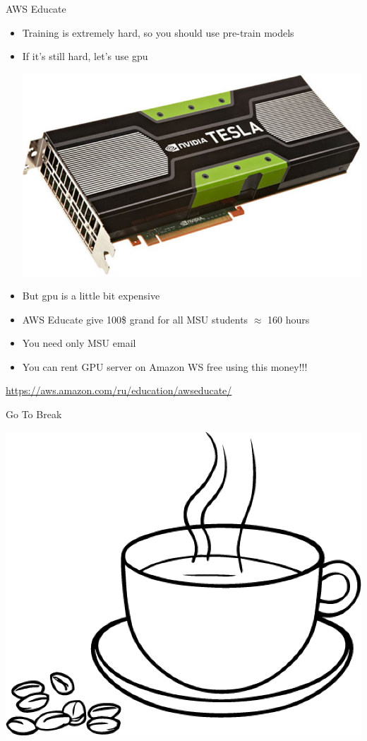 \documentclass{beamer}
\begin{document}
\begin{frame}{AWS Educate}
	\begin{itemize}
		\item  Training is extremely hard, so you should use pre-train models
		\item  If it's still hard, let's use gpu
				\begin{center}
					\includegraphics[scale=0.3]{img/tesla}
				\end{center}
		\item  But gpu is a little bit expensive
		\item  AWS Educate give 100\$ grand for all MSU students $\approx$ 160 hours
		\item  You need only MSU email
		\item  You can rent GPU server on Amazon WS free using this money!!!
	\end{itemize}
	 \href{https://aws.amazon.com/ru/education/awseducate/}{https://aws.amazon.com/ru/education/awseducate/}
\end{frame}

\begin{frame}{Go To Break}
		\begin{center}
			\includegraphics[scale=0.25]{img/cof.png}
		\end{center}
\end{frame}
\end{document}
